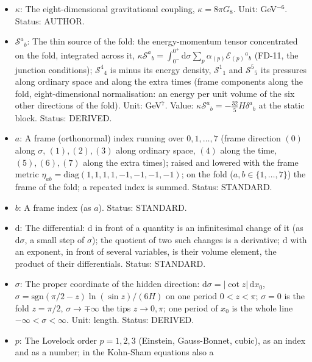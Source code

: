 \documentclass[
  10pt,
]{article}
\providecommand{\tightlist}{%
  \setlength{\itemsep}{0pt}\setlength{\parskip}{0pt}}
\begin{document}
\begin{itemize}
\tightlist
\item
  \(\kappa\): The eight-dimensional gravitational coupling,
  \(\kappa = 8\pi G_8\). Unit: GeV\(^{-6}\). Status: AUTHOR.
\item
  \(\mathcal{S}^a{}_b\): The thin source of the fold: the
  energy-momentum tensor concentrated on the fold, integrated across it,
  \(\kappa\mathcal{S}^a{}_b = \int_{0^-}^{0^+}\mathrm{d}\sigma\sum_p\alpha_{(p)}\mathcal{E}_{(p)}{}^a{}_b\)
  (FD-11, the junction conditions); \(\mathcal{S}^4{}_4\) is minus its
  energy density, \(\mathcal{S}^1{}_1\) and \(\mathcal{S}^5{}_5\) its
  pressures along ordinary space and along the extra times (frame
  components along the fold, eight-dimensional normalisation: an energy
  per unit volume of the six other directions of the fold). Unit:
  GeV\(^7\). Value:
  \(\kappa\mathcal{S}^a{}_b = -\frac{32}{5}H\delta^a{}_b\) at the static
  block. Status: DERIVED.
\item
  \(a\): A frame (orthonormal) index running over \(0, 1, \dots, 7\)
  (frame direction \((0)\) along \(\sigma\), \((1), (2), (3)\) along
  ordinary space, \((4)\) along the time, \((5), (6), (7)\) along the
  extra times); raised and lowered with the frame metric
  \(\eta_{ab} = \mathrm{diag}(1, 1, 1, 1, -1, -1, -1, -1)\); on the fold
  (\(a, b \in \{1, \dots, 7\}\)) the frame of the fold; a repeated index
  is summed. Status: STANDARD.
\item
  \(b\): A frame index (as \(a\)). Status: STANDARD.
\item
  \(\mathrm{d}\): The differential: \(\mathrm{d}\) in front of a
  quantity is an infinitesimal change of it (as \(\mathrm{d}\sigma\), a
  small step of \(\sigma\)); the quotient of two such changes is a
  derivative; \(\mathrm{d}\) with an exponent, in front of several
  variables, is their volume element, the product of their
  differentials. Status: STANDARD.
\item
  \(\sigma\): The proper coordinate of the hidden direction:
  \(\mathrm{d}\sigma = \lvert\cot z\rvert\,\mathrm{d}x_0\),
  \(\sigma = \mathrm{sgn}(\pi/2 - z)\ln(\sin z)/(6H)\) on one period
  \(0 < z < \pi\); \(\sigma = 0\) is the fold \(z = \pi/2\),
  \(\sigma \to \mp\infty\) the tips \(z \to 0, \pi\); one period of
  \(x_0\) is the whole line \(-\infty < \sigma < \infty\). Unit: length.
  Status: DERIVED.
\item
  \(p\): The Lovelock order \(p = 1, 2, 3\) (Einstein, Gauss-Bonnet,
  cubic), as an index and as a number; in the Kohn-Sham equations also a

\end{itemize}
\end{document}

